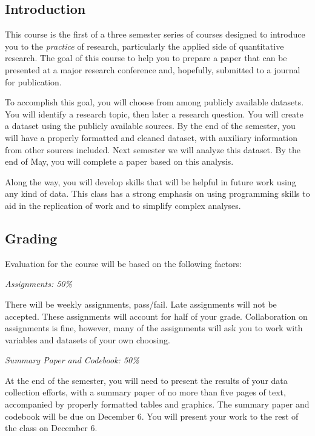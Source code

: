 \documentclass[12pt]{article}
\begin{document}
\subsection{Introduction}%
\begin{flushleft}

  This course is the first of a three semester series of courses
  designed to introduce you to the \textit{practice} of research,
  particularly the applied side of quantitative research. The goal of
  this course to help you to prepare a paper that can be presented at
  a major research conference and, hopefully, submitted to a journal
  for publication.

  To accomplish this goal, you will choose from among publicly
  available datasets. You will identify a research topic, then later a
  research question. You will create a dataset using the publicly
  available sources.  By the end of the semester, you will have a
  properly formatted and cleaned dataset, with auxiliary information
  from other sources included. Next semester we will analyze this
  dataset. By the end of May, you will complete a paper based on this
  analysis.

  Along the way, you will develop skills that will be helpful in
  future work using any kind of data. This class has a strong emphasis
  on using programming skills to aid in the replication of work and to
  simplify complex analyses.


\end{flushleft}

\subsection{Grading}%
\begin{flushleft}
Evaluation for the course will be based on the following factors:

\textit{Assignments: 50\%}

There will be weekly assignments,
pass/fail. Late assignments will not be accepted. These assignments
will account for half of your grade. Collaboration on assignments is
fine, however, many of the assignments will ask you to work with
variables and datasets of your own choosing.

\textit{Summary Paper and Codebook: 50\%}

At the end of the semester, you will need to present the results of
your data collection efforts, with a summary paper of no more than
five pages of text, accompanied by properly formatted tables and
graphics. The summary paper and codebook will be due on December
6. You will present your work to the rest of the class on December 6.



\end{flushleft}
\end{document}

